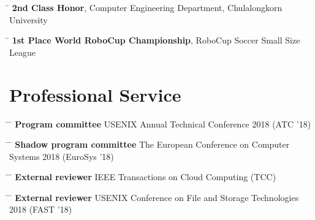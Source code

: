 \documentclass[10pt]{article} %
\begin{document}
\begin{tabbing}
\hspace{2.5cm} \=  \> \textbf{2nd Class Honor}, Computer Engineering Department, Chulalongkorn University
\end{tabbing}

\begin{tabbing}
\hspace{2.5cm} \=  \> \textbf{1st Place World RoboCup Championship}, RoboCup Soccer Small Size League
\end{tabbing}


\section{Professional Service}

\begin{tabbing}
\hspace{2.5cm} \= \hspace{4.5cm}  \=  \> \textbf{Program committee} \> USENIX Annual Technical Conference 2018 (ATC '18)
\end{tabbing}

\begin{tabbing}
\hspace{2.5cm} \= \hspace{4.5cm}  \=  \> \textbf{Shadow program committee} \> The European Conference on Computer Systems 2018 (EuroSys '18)
\end{tabbing}

\begin{tabbing}
\hspace{2.5cm} \= \hspace{4.5cm}  \=  \> \textbf{External reviewer} \> IEEE Transactions on Cloud Computing (TCC)
\end{tabbing}

\begin{tabbing}
\hspace{2.5cm} \= \hspace{4.5cm}  \=  \> \textbf{External reviewer} \> USENIX Conference on File and Storage Technologies 2018 (FAST '18)
\end{tabbing}

\end{document}
